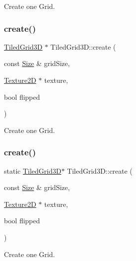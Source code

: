 Create one Grid. \mbox{\label{classTiledGrid3D_af0c43e7194a4f39bb81437f71c54827a}} 
\subsubsection{\texorpdfstring{create()}{create()}\hspace{0.1cm}{\footnotesize\ttfamily [5/8]}}
{\footnotesize\ttfamily \hyperlink{classTiledGrid3D}{Tiled\+Grid3D} $\ast$ Tiled\+Grid3\+D\+::create (\begin{DoxyParamCaption}\item[{const \hyperlink{classSize}{Size} \&}]{grid\+Size,  }\item[{\hyperlink{classTexture2D}{Texture2D} $\ast$}]{texture,  }\item[{bool}]{flipped }\end{DoxyParamCaption})\hspace{0.3cm}{\ttfamily [static]}}

Create one Grid. \mbox{\label{classTiledGrid3D_a67d793707c95274ed22b566ebd9fdbf5}} 
\subsubsection{\texorpdfstring{create()}{create()}\hspace{0.1cm}{\footnotesize\ttfamily [6/8]}}
{\footnotesize\ttfamily static \hyperlink{classTiledGrid3D}{Tiled\+Grid3D}$\ast$ Tiled\+Grid3\+D\+::create (\begin{DoxyParamCaption}\item[{const \hyperlink{classSize}{Size} \&}]{grid\+Size,  }\item[{\hyperlink{classTexture2D}{Texture2D} $\ast$}]{texture,  }\item[{bool}]{flipped }\end{DoxyParamCaption})\hspace{0.3cm}{\ttfamily [static]}}

Create one Grid. \mbox{\label{classTiledGrid3D_a2e77dedb106db1ae6ea0cf8ecd55c5a6}} 
